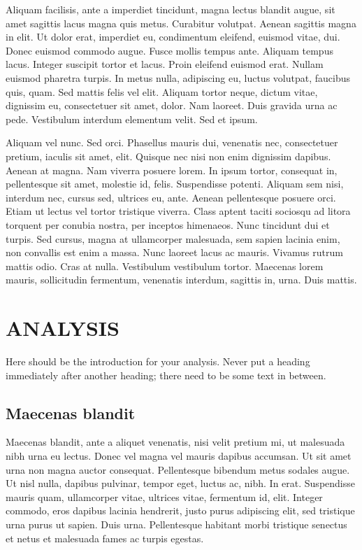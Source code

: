 \documentclass[12pt]{article}
\begin{document}
Aliquam facilisis, ante a imperdiet tincidunt, magna lectus blandit augue, sit amet sagittis lacus magna quis metus. Curabitur volutpat. Aenean sagittis magna in elit. Ut dolor erat, imperdiet eu, condimentum eleifend, euismod vitae, dui. Donec euismod commodo augue. Fusce mollis tempus ante. Aliquam tempus lacus. Integer suscipit tortor et lacus. Proin eleifend euismod erat. Nullam euismod pharetra turpis. In metus nulla, adipiscing eu, luctus volutpat, faucibus quis, quam. Sed mattis felis vel elit. Aliquam tortor neque, dictum vitae, dignissim eu, consectetuer sit amet, dolor. Nam laoreet. Duis gravida urna ac pede. Vestibulum interdum elementum velit. Sed et ipsum.

Aliquam vel nunc. Sed orci. Phasellus mauris dui, venenatis nec, consectetuer pretium, iaculis sit amet, elit. Quisque nec nisi non enim dignissim dapibus. Aenean at magna. Nam viverra posuere lorem. In ipsum tortor, consequat in, pellentesque sit amet, molestie id, felis. Suspendisse potenti. Aliquam sem nisi, interdum nec, cursus sed, ultrices eu, ante. Aenean pellentesque posuere orci. Etiam ut lectus vel tortor tristique viverra. Class aptent taciti sociosqu ad litora torquent per conubia nostra, per inceptos himenaeos. Nunc tincidunt dui et turpis. Sed cursus, magna at ullamcorper malesuada, sem sapien lacinia enim, non convallis est enim a massa. Nunc laoreet lacus ac mauris. Vivamus rutrum mattis odio. Cras at nulla. Vestibulum vestibulum tortor. Maecenas lorem mauris, sollicitudin fermentum, venenatis interdum, sagittis in, urna. Duis mattis.

\section{ANALYSIS}

Here should be the introduction for your analysis. Never put a heading immediately after another heading; there need to be some text in between.

\subsection{Maecenas blandit}

Maecenas blandit, ante a aliquet venenatis, nisi velit pretium mi, ut malesuada nibh urna eu lectus. Donec vel magna vel mauris dapibus accumsan. Ut sit amet urna non magna auctor consequat. Pellentesque bibendum metus sodales augue. Ut nisl nulla, dapibus pulvinar, tempor eget, luctus ac, nibh. In erat. Suspendisse mauris quam, ullamcorper vitae, ultrices vitae, fermentum id, elit. Integer commodo, eros dapibus lacinia hendrerit, justo purus adipiscing elit, sed tristique urna purus ut sapien. Duis urna. Pellentesque habitant morbi tristique senectus et netus et malesuada fames ac turpis egestas. \cite{test1}
\end{document}
